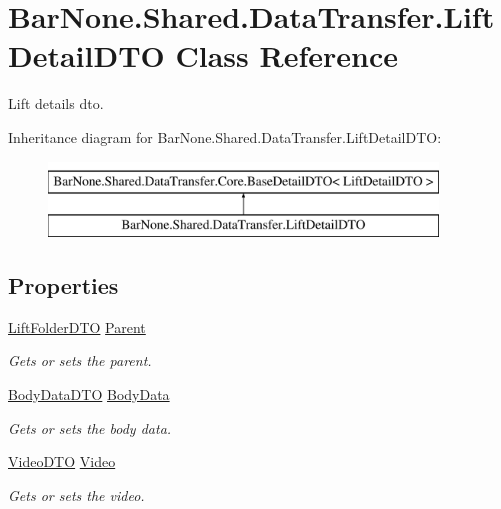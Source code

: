 \hypertarget{class_bar_none_1_1_shared_1_1_data_transfer_1_1_lift_detail_d_t_o}{}\section{Bar\+None.\+Shared.\+Data\+Transfer.\+Lift\+Detail\+D\+TO Class Reference}
\label{class_bar_none_1_1_shared_1_1_data_transfer_1_1_lift_detail_d_t_o}


Lift details dto.  


Inheritance diagram for Bar\+None.\+Shared.\+Data\+Transfer.\+Lift\+Detail\+D\+TO\+:\begin{figure}[H]
\begin{center}
\leavevmode
\includegraphics[height=2.000000cm]{class_bar_none_1_1_shared_1_1_data_transfer_1_1_lift_detail_d_t_o}
\end{center}
\end{figure}
\subsection*{Properties}
\begin{DoxyCompactItemize}
\item 
\mbox{\hyperlink{class_bar_none_1_1_shared_1_1_data_transfer_1_1_lift_folder_d_t_o}{Lift\+Folder\+D\+TO}} \mbox{\hyperlink{class_bar_none_1_1_shared_1_1_data_transfer_1_1_lift_detail_d_t_o_a2dddae9d347757f5cd234fc80c9dbc05}{Parent}}
\begin{DoxyCompactList}\small\item\em Gets or sets the parent. \end{DoxyCompactList}\item 
\mbox{\hyperlink{class_bar_none_1_1_shared_1_1_data_transfer_1_1_body_data_d_t_o}{Body\+Data\+D\+TO}} \mbox{\hyperlink{class_bar_none_1_1_shared_1_1_data_transfer_1_1_lift_detail_d_t_o_affaeac3cfb7d9ae5817b1ec8a9bfc50f}{Body\+Data}}
\begin{DoxyCompactList}\small\item\em Gets or sets the body data. \end{DoxyCompactList}\item 
\mbox{\hyperlink{class_bar_none_1_1_shared_1_1_data_transfer_1_1_video_d_t_o}{Video\+D\+TO}} \mbox{\hyperlink{class_bar_none_1_1_shared_1_1_data_transfer_1_1_lift_detail_d_t_o_a4c527455c0a6db44f0e8224cffd2e24d}{Video}}
\begin{DoxyCompactList}\small\item\em Gets or sets the video. \end{DoxyCompactList}\end{DoxyCompactItemize}


